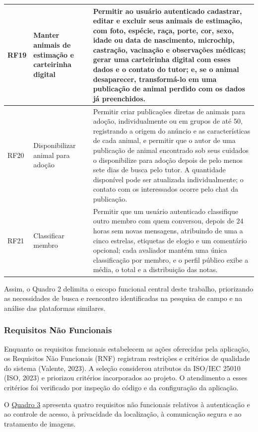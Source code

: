 {\begin{longtable}{|>{\centering\arraybackslash}p{1.3cm}|>{\raggedright\arraybackslash}p{4.2cm}|>{\raggedright\arraybackslash}p{8.8cm}|}
RF19 & Manter animais de estimação e carteirinha digital & Permitir ao usuário autenticado cadastrar, editar e excluir seus animais de estimação, com foto, espécie, raça, porte, cor, sexo, idade ou data de nascimento, microchip, castração, vacinação e observações médicas; gerar uma carteirinha digital com esses dados e o contato do tutor; e, se o animal desaparecer, transformá-lo em uma publicação de animal perdido com os dados já preenchidos. \\ \hline
RF20 & Disponibilizar animal para adoção & Permitir criar publicações diretas de animais para adoção, individualmente ou em grupos de até 50, registrando a origem do anúncio e as características de cada animal, e permitir que o autor de uma publicação de animal encontrado sob seus cuidados o disponibilize para adoção depois de pelo menos sete dias de busca pelo tutor. A quantidade disponível pode ser atualizada individualmente; o contato com os interessados ocorre pelo chat da publicação. \\ \hline
RF21 & Classificar membro & Permitir que um usuário autenticado classifique outro membro com quem conversou, depois de 24 horas sem novas mensagens, atribuindo de uma a cinco estrelas, etiquetas de elogio e um comentário opcional; cada avaliador mantém uma única classificação por membro, e o perfil público exibe a média, o total e a distribuição das notas. \\ \hline
\end{longtable}
}

Assim, o Quadro 2 delimita o escopo funcional central deste trabalho, priorizando as necessidades de busca e reencontro identificadas na pesquisa de campo e na análise das plataformas similares.


\subsubsection{Requisitos Não Funcionais}

Enquanto os requisitos funcionais estabelecem as ações oferecidas pela aplicação, os Requisitos Não Funcionais (RNF) registram restrições e critérios de qualidade do sistema (Valente, 2023). A seleção considerou atributos da ISO/IEC 25010 (ISO, 2023) e priorizou critérios incorporados ao projeto. O atendimento a esses critérios foi verificado por inspeção do código e da configuração da aplicação.

O \hyperref[quadro:nao_funcionais]{Quadro 3} apresenta quatro requisitos não funcionais relativos à autenticação e ao controle de acesso, à privacidade da localização, à comunicação segura e ao tratamento de imagens.

